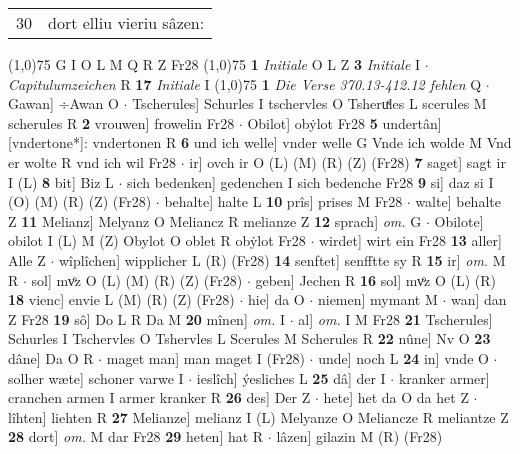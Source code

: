 \documentclass[8pt,a4paper,notitlepage]{article}
\begin{document}
\begin{table}[ht]
\begin{minipage}[t]{0.5\linewidth}
\begin{tabular}{rl}
30 & dort elliu vieriu sâzen:\\ 
\end{tabular}
\scriptsize
\line(1,0){75} \newline
G I O L M Q R Z Fr28 \newline
\line(1,0){75} \newline
\textbf{1} \textit{Initiale} O L Z  \textbf{3} \textit{Initiale} I   $\cdot$ \textit{Capitulumzeichen} R  \textbf{17} \textit{Initiale} I  \newline
\line(1,0){75} \newline
\textbf{1} \textit{Die Verse 370.13-412.12 fehlen} Q   $\cdot$ Gawan] ÷Awan O  $\cdot$ Tscherules] Schurles I tschervles O Tsheruͯles L scerules M scherules R \textbf{2} vrouwen] frowelin Fr28  $\cdot$ Obilot] obẏlot Fr28 \textbf{5} undertân] [vndertone*]: vndertonen R \textbf{6} und ich welle] vnder welle G Vnde ich wolde M Vnd er wolte R vnd ich wil Fr28  $\cdot$ ir] ovch ir O (L) (M) (R) (Z) (Fr28) \textbf{7} saget] sagt ir I (L) \textbf{8} bit] Biz L  $\cdot$ sich bedenken] gedenchen I sich bedenche Fr28 \textbf{9} si] daz si I (O) (M) (R) (Z) (Fr28)  $\cdot$ behalte] halte L \textbf{10} prîs] prises M Fr28  $\cdot$ walte] behalte Z \textbf{11} Melianz] Melyanz O Meliancz R melianze Z \textbf{12} sprach] \textit{om.} G  $\cdot$ Obilote] obilot I (L) M (Z) Obylot O oblet R obẏlot Fr28  $\cdot$ wirdet] wirt ein Fr28 \textbf{13} aller] Alle Z  $\cdot$ wîplîchen] wipplicher L (R) (Fr28) \textbf{14} senftet] senfftte sy R \textbf{15} ir] \textit{om.} M R  $\cdot$ sol] mvͦz O (L) (M) (R) (Z) (Fr28)  $\cdot$ geben] Jechen R \textbf{16} sol] mvͦz O (L) (R) \textbf{18} vienc] envie L (M) (R) (Z) (Fr28)  $\cdot$ hie] da O  $\cdot$ niemen] mymant M  $\cdot$ wan] dan Z Fr28 \textbf{19} sô] Do L R Da M \textbf{20} mînen] \textit{om.} I  $\cdot$ al] \textit{om.} I M Fr28 \textbf{21} Tscherules] Schurles I Tschervles O Tshervles L Scerules M Scherules R \textbf{22} nûne] Nv O \textbf{23} dâne] Da O R  $\cdot$ maget man] man maget I (Fr28)  $\cdot$ unde] noch L \textbf{24} in] vnde O  $\cdot$ solher wæte] schoner varwe I  $\cdot$ ieslîch] ýesliches L \textbf{25} dâ] der I  $\cdot$ kranker armer] cranchen armen I armer kranker R \textbf{26} des] Der Z  $\cdot$ hete] het da O da het Z  $\cdot$ lîhten] liehten R \textbf{27} Melianze] melianz I (L) Melyanze O Meliancze R meliantze Z \textbf{28} dort] \textit{om.} M dar Fr28 \textbf{29} heten] hat R  $\cdot$ lâzen] gilazin M (R) (Fr28) \newline
\end{minipage}
\hspace{0.5cm}

\end{table}
\end{document}
